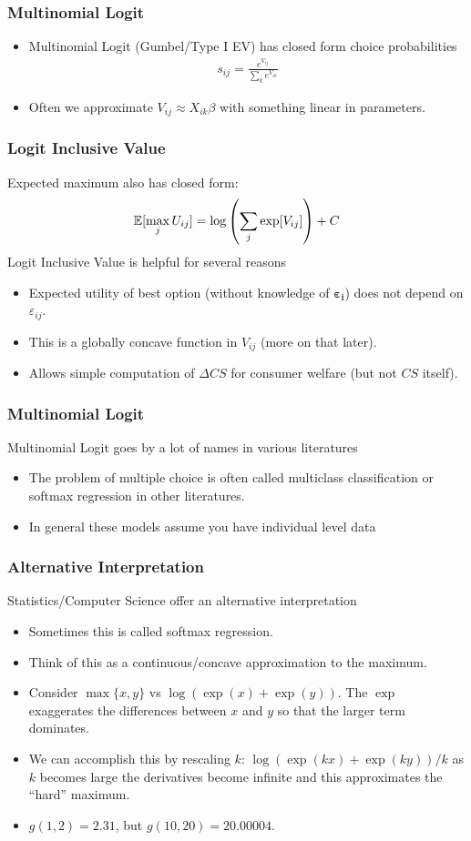 \documentclass[aspectratio=169,11pt]{beamer}
\begin{document}
\begin{frame}
\frametitle{Multinomial Logit}
\begin{itemize}
\item Multinomial Logit (Gumbel/Type I EV) has closed form choice probabilities
\begin{eqnarray*}
s_{ij} = \frac{e^{V_{ij}}}{\sum_k e^{V_{ik}}}
\end{eqnarray*}
\item Often we approximate $V_{ij} \approx  X_{ik} \beta$ with something linear in parameters.
\end{itemize}
\end{frame}


\begin{frame}
\frametitle{Logit Inclusive Value}
 Expected maximum also has closed form:
\begin{eqnarray*}
\mathbb{E}[\max_j U_{ij}] = \log \left(\sum_j \exp[V_{ij}] \right) + C
\end{eqnarray*}
Logit Inclusive Value is helpful for several reasons
\begin{itemize}
\item Expected utility of best option (without knowledge of $\boldsymbol{\varepsilon_i}$) does not depend on $\varepsilon_{ij}$.
\item This is a globally concave function in $V_{ij}$ (more on that later).
\item Allows simple computation of $\Delta CS$ for consumer welfare (but not $CS$ itself).
\end{itemize}
\end{frame}

\begin{frame}
\frametitle{Multinomial Logit}
Multinomial Logit goes by a lot of names in various literatures
\begin{itemize}
\item The problem of multiple choice is often called \alert{multiclass classification} or \alert{softmax regression} in other literatures.
\item In general these models assume you have individual level data
\end{itemize}
\end{frame}

\begin{frame}
\frametitle{Alternative Interpretation}
Statistics/Computer Science offer an alternative interpretation
\begin{itemize}
\item Sometimes this is called \alert{softmax} regression.
\item Think of this as a continuous/concave approximation to the maximum.
\item Consider $\max\{x,y\}$ vs $\log(\exp(x) + \exp(y))$. The $\exp$ exaggerates the differences between $x$ and $y$ so that the larger term dominates.
\item We can accomplish this by rescaling $k$:  $\log(\exp(kx) + \exp(ky))/k$ as $k$ becomes large the derivatives become infinite and this approximates the ``hard'' maximum.
\item $g(1, 2) = 2.31$, but $g(10, 20) = 20.00004$.
\end{itemize}
\end{frame}
\end{document}
